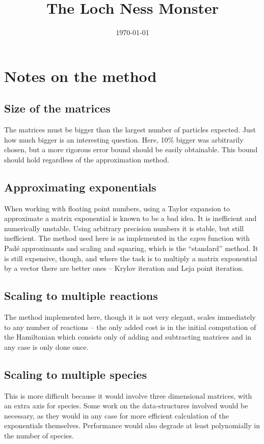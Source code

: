 \documentclass{amsart}
\title{The Loch Ness Monster}
\date{\today}
\begin{document}
\maketitle


\section*{Notes on the method}
\subsection*{Size of the matrices}
The matrices must be bigger than the largest number of particles
expected. Just how much bigger is an interesting question. Here, 10\%
bigger was arbitrarily chosen, but a more rigorous error bound should
be easily obtainable. This bound should hold regardless of the
approximation method.

\subsection*{Approximating exponentials}
When working with floating point numbers, using a Taylor expansion to
approximate a matrix exponential is known to be a bad idea. It is
inefficient and numerically unstable. Using arbitrary precision
numbers it is stable, but still inefficient. The method used here is
as implemented in the \emph{expm} function with Pad\'{e} approximants
and scaling and squaring, which is the ``standard'' method. It is
still expensive, though, and where the task is to multiply a matrix
exponential by a vector there are better ones -- Krylov iteration and
Leja point iteration.

\subsection*{Scaling to multiple reactions}
The method implemented here, though it is not very elegant, scales
immediately to any number of reactions -- the only added cost is in
the initial computation of the Hamiltonian which consists only of
adding and subtracting matrices and in any case is only done once.

\subsection*{Scaling to multiple species}
This is more difficult because it would involve three dimensional
matrices, with an extra axis for species. Some work on the
data-structures involved would be necessary, as they would in any case
for more efficient calculation of the exponentials
themselves. Performance would also degrade at least polynomially in
the number of species.
\end{document}
